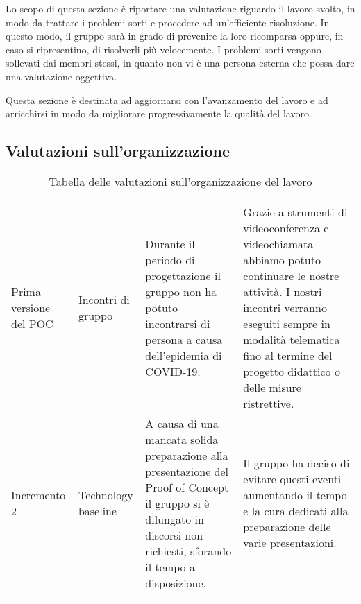 \documentclass[../piano-di-qualifica.tex]{subfiles}
\begin{document}
Lo scopo di questa sezione è riportare una valutazione riguardo il lavoro svolto, in modo da trattare
i problemi sorti e procedere ad un'efficiente risoluzione.
In questo modo, il gruppo sarà in grado di prevenire la loro ricomparsa oppure, in caso si ripresentino, di risolverli più velocemente.
I problemi sorti vengono sollevati dai membri stessi, in quanto non vi è una
persona esterna che possa dare una valutazione oggettiva.

Questa sezione è destinata ad aggiornarsi con l'avanzamento del lavoro e ad arricchirsi in modo
da migliorare progressivamente la qualità del lavoro.

\subsection{Valutazioni sull'organizzazione}

\begin{longtable}[H]{>{\centering\arraybackslash}m{3cm} >{\centering\arraybackslash}m{3cm} >{\centering\arraybackslash}m{5cm} >{\centering\arraybackslash}m{5cm}}
  \rowcolor{darkgray!90!}
  \color{white}{\textbf{Fase}} & \color{white}{\textbf{Dominio}} & \color{white}{\textbf{Problema}}                                                                                                                                         & \color{white}{\textbf{Soluzione}}                                                                                                                                                                                                        \\
  Prima versione del POC       & Incontri di gruppo              & Durante il periodo di progettazione il gruppo non ha potuto incontrarsi di persona a causa dell'epidemia di COVID-19.                                                    & Grazie a strumenti di videoconferenza e videochiamata abbiamo potuto continuare le nostre attività. I nostri incontri verranno eseguiti sempre in modalità telematica fino al termine del progetto didattico o delle misure ristrettive. \\
  Incremento 2                 & Technology baseline             & A causa di una mancata solida preparazione alla presentazione del Proof of Concept il gruppo si è dilungato in discorsi non richiesti, sforando il tempo a disposizione. & Il gruppo ha deciso di evitare questi eventi aumentando il tempo e la cura dedicati alla preparazione delle varie presentazioni.                                                                                                         \\
  \rowcolor{white}
  \caption{Tabella delle valutazioni sull'organizzazione del lavoro}%
  \label{tab:valutazioni_organizzazione}
\end{longtable}
\end{document}
